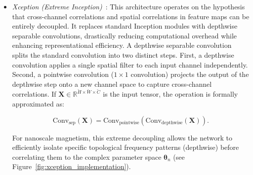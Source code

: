 \documentclass[final,5p,times,twocolumn]{elsarticle}
\begin{document}
\begin{itemize}
\begin{equation}\label{eq:DenseNet}
\mathbf{x}_l = H_l([\mathbf{x}_0, \mathbf{x}_1, \dots, \mathbf{x}_{l-1}]),
\end{equation}
where $[\dots]$ denotes the concatenation operation. This dense topological structure ensures that the final regression head has direct access to both fine-grained pixel interactions and coarse global structures (see Figure~\ref{fig:densenet_implementation}).

\begin{figure}[t!]
    \centering
    \resizebox{\linewidth}{!}{
    }
\caption{DenseNet121 architecture pipeline for Hamiltonian parameter estimation. The pipeline progresses left-to-right, processing single-channel inputs through the feature extractor composed of Dense Blocks and Transition layers. A detailed horizontal view illustrates the dense connectivity mechanism where feature maps from all preceding layers are concatenated before convolution. The final aggregated features are mapped to physical constants via the customized regression head.}
\label{fig:densenet_implementation}
\end{figure}


\item[--] \emph{Xception (Extreme Inception)}~\cite{chollet2017xception}: This architecture operates on the hypothesis that cross-channel correlations and spatial correlations in feature maps can be entirely decoupled. It replaces standard Inception modules with depthwise separable convolutions, drastically reducing computational overhead while enhancing representational efficiency. A depthwise separable convolution splits the standard convolution into two distinct steps. First, a depthwise convolution applies a single spatial filter to each input channel independently. Second, a pointwise convolution ($1 \times 1$ convolution) projects the output of the depthwise step onto a new channel space to capture cross-channel correlations. If $\mathbf{X} \in \mathbb{R}^{\breve{H} \times \breve{W} \times \breve{C}}$ is the input tensor, the operation is formally approximated as:

\begin{equation}\label{eq:Xception}
\text{Conv}_{\text{sep}}(\mathbf{X}) = \text{Conv}_{\text{pointwise}}(\text{Conv}_{\text{depthwise}}(\mathbf{X})).
\end{equation}

For nanoscale magnetism, this extreme decoupling allows the network to efficiently isolate specific topological frequency patterns (depthwise) before correlating them to the complex parameter space $\boldsymbol{\theta}_n$ (see Figure~\ref{fig:xception_implementation}).


\end{itemize}
\end{document}
